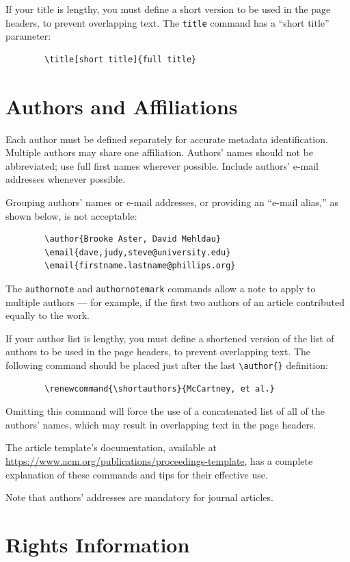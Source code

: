 \documentclass[acmlarge]{acmart}
\begin{document}
	If your title is lengthy, you must define a short version to be used
	in the page headers, to prevent overlapping text. The \verb|title|
	command has a ``short title'' parameter:
	\begin{verbatim}
		\title[short title]{full title}
	\end{verbatim}
	
	\section{Authors and Affiliations}
	
	Each author must be defined separately for accurate metadata
	identification. Multiple authors may share one affiliation. Authors'
	names should not be abbreviated; use full first names wherever
	possible. Include authors' e-mail addresses whenever possible.
	
	Grouping authors' names or e-mail addresses, or providing an ``e-mail
	alias,'' as shown below, is not acceptable:
	\begin{verbatim}
		\author{Brooke Aster, David Mehldau}
		\email{dave,judy,steve@university.edu}
		\email{firstname.lastname@phillips.org}
	\end{verbatim}
	
	The \verb|authornote| and \verb|authornotemark| commands allow a note
	to apply to multiple authors --- for example, if the first two authors
	of an article contributed equally to the work.
	
	If your author list is lengthy, you must define a shortened version of
	the list of authors to be used in the page headers, to prevent
	overlapping text. The following command should be placed just after
	the last \verb|\author{}| definition:
	\begin{verbatim}
		\renewcommand{\shortauthors}{McCartney, et al.}
	\end{verbatim}
	Omitting this command will force the use of a concatenated list of all
	of the authors' names, which may result in overlapping text in the
	page headers.
	
	The article template's documentation, available at
	\url{https://www.acm.org/publications/proceedings-template}, has a
	complete explanation of these commands and tips for their effective
	use.
	
	Note that authors' addresses are mandatory for journal articles.
	
	\section{Rights Information}
	
\end{document}
